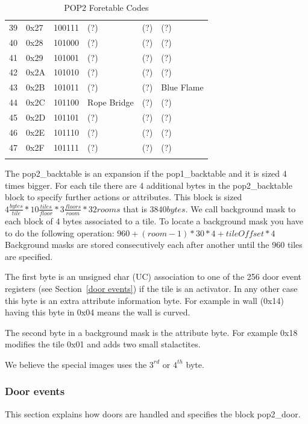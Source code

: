 \documentclass{article}
\begin{document}
\begin{longtable}{llllll}
 39 & 0x27 & 100111 & (?)                & (?)               & (?) \\
 40 & 0x28 & 101000 & (?)                & (?)               & (?) \\
 41 & 0x29 & 101001 & (?)                & (?)               & (?) \\
 42 & 0x2A & 101010 & (?)                & (?)               & (?) \\
 43 & 0x2B & 101011 & (?)                & (?)               & Blue Flame \\
 44 & 0x2C & 101100 & Rope Bridge        & (?)               & (?) \\
 45 & 0x2D & 101101 & (?)                & (?)               & (?) \\
 46 & 0x2E & 101110 & (?)                & (?)               & (?) \\
 47 & 0x2F & 101111 & (?)                & (?)               & (?) \\
\hline
\caption{POP2 Foretable Codes}
\label{dat2 foretable}
\end{longtable}

 The pop2\_backtable is an expansion if the pop1\_backtable and it is sized
 4 times bigger. For each tile there are 4 additional bytes in the 
 pop2\_backtable block to specify further actions or attributes. This block
 is sized $4 \frac{bytes}{tile} * 10 \frac{tiles}{floor} * 3 \frac{floors}{room} * 32 rooms$ that is
 $3840 bytes$.
 We call background mask to each block of 4 bytes associated to a tile. To
 locate a background mask you have to do the following operation:
  $960+(room-1)*30*4+tileOffset*4$
 Background masks are stored consecutively each after another until the
 960 tiles are specified.
 
 The first byte is an unsigned char (UC) association to one of the 256 door
 event registers (see Section~\ref{door events}) if the tile is an activator.
 In any other case this byte is an extra attribute information byte.
 For example in wall (0x14) having this byte in 0x04 means the wall is
 curved.
 
 The second byte in a background mask is the attribute byte. For example
 0x18 modifies the tile 0x01 and adds two small stalactites.
 
 We believe the special images uses the $3^{rd}$ or $4^{th}$ byte.

\subsubsection{Door events \label{door events}} %
 This section explains how doors are handled and specifies the block
 pop2\_door.
\end{document}
